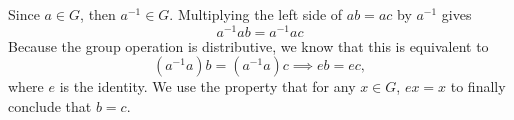 \begin{sol}
    Since $a\in G$, then $a^{-1} \in G$. Multiplying the left side of $ab=ac$ by $a^{-1}$ gives
    $$a^{-1}ab = a^{-1}ac$$
    Because the group operation is distributive, we know that this is equivalent to 
    $$(a^{-1}a)b = (a^{-1}a)c \implies eb = ec,$$
    where $e$ is the identity. We use the property that for any $x\in G$, $ex=x$ to finally conclude that $b=c$.
\end{sol}